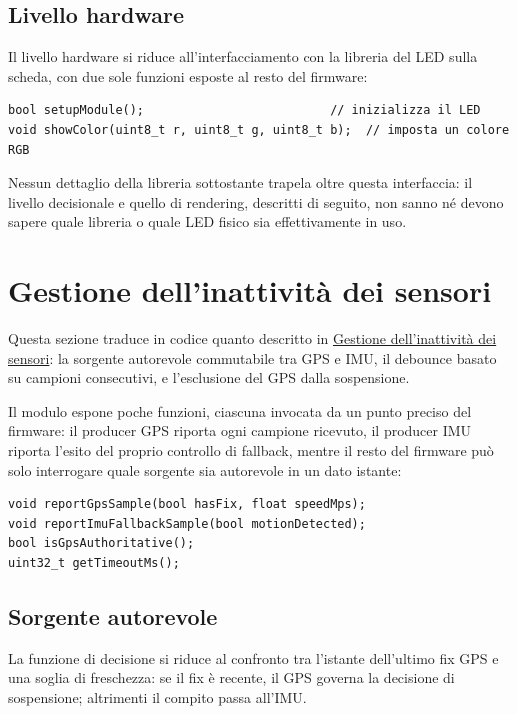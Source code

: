 \subsection{Livello hardware}
Il livello hardware si riduce all'interfacciamento con la libreria del
LED sulla scheda, con due sole funzioni esposte al resto del firmware:

\begin{listing}[H]
\begin{verbatim}
bool setupModule();                          // inizializza il LED
void showColor(uint8_t r, uint8_t g, uint8_t b);  // imposta un colore RGB
\end{verbatim}
\caption{Interfaccia del livello hardware}
\label{listing:led-hardware}
\end{listing}

Nessun dettaglio della libreria sottostante trapela oltre questa interfaccia: il
livello decisionale e quello di rendering, descritti di seguito, non sanno né
devono sapere quale libreria o quale LED fisico sia effettivamente in uso.

\newpage

\section{Gestione dell'inattività dei sensori}

Questa sezione traduce in codice quanto descritto in
\hyperref[sec:inattivita]{Gestione dell'inattività dei sensori}: la sorgente
autorevole commutabile tra GPS e IMU, il debounce basato su campioni
consecutivi, e l'esclusione del GPS dalla sospensione.

Il modulo espone poche funzioni, ciascuna invocata da un punto preciso del
firmware: il producer GPS riporta ogni campione ricevuto, il producer IMU
riporta l'esito del proprio controllo di fallback, mentre il resto del
firmware può solo interrogare quale sorgente sia autorevole in un dato
istante:

\begin{listing}[H]
\begin{verbatim}
void reportGpsSample(bool hasFix, float speedMps);
void reportImuFallbackSample(bool motionDetected);
bool isGpsAuthoritative();
uint32_t getTimeoutMs();
\end{verbatim}
\caption{Interfaccia del modulo di gestione dell'inattività}
\label{listing:inactivity-interface}
\end{listing}

\subsection{Sorgente autorevole}
La funzione di decisione si riduce al confronto tra l'istante dell'ultimo fix
GPS e una soglia di freschezza: se il fix è recente, il GPS governa la
decisione di sospensione; altrimenti il compito passa all'IMU.

